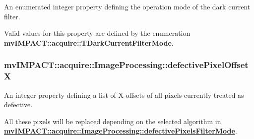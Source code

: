 An enumerated integer property defining the operation mode of the dark current filter. 

Valid values for this property are defined by the enumeration {\bfseries mv\+I\+M\+P\+A\+C\+T\+::acquire\+::\+T\+Dark\+Current\+Filter\+Mode}. \hypertarget{classmv_i_m_p_a_c_t_1_1acquire_1_1_image_processing_a0a5a32575a86e5f69eea1b5a0e1bb728}{
\subsubsection[{defective\+Pixel\+Offset\+X}]{ mv\+I\+M\+P\+A\+C\+T\+::acquire\+::\+Image\+Processing\+::defective\+Pixel\+Offset\+X}}\label{classmv_i_m_p_a_c_t_1_1acquire_1_1_image_processing_a0a5a32575a86e5f69eea1b5a0e1bb728}


An integer property defining a list of X-\/offsets of all pixels currently treated as defective. 

All these pixels will be replaced depending on the selected algorithm in {\bfseries \hyperlink{classmv_i_m_p_a_c_t_1_1acquire_1_1_image_processing_ae1e060a70ed836297ef3886db0bf8a95}{mv\+I\+M\+P\+A\+C\+T\+::acquire\+::\+Image\+Processing\+::defective\+Pixels\+Filter\+Mode}}.

